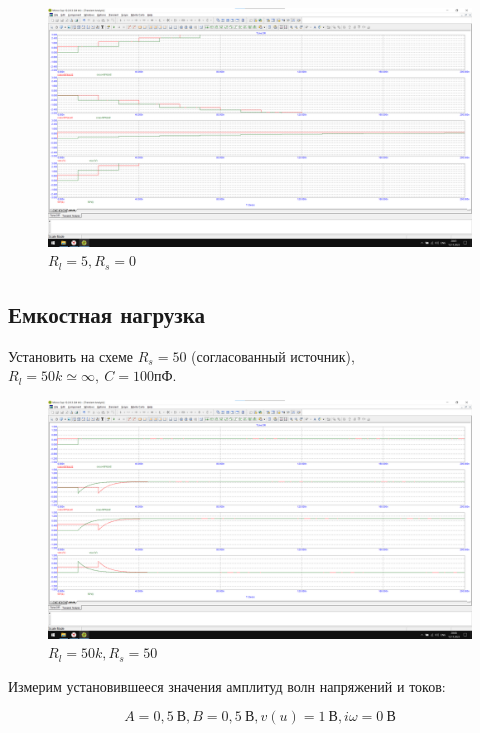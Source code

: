 \documentclass[a4paper, 12pt]{article}
\begin{document}
    \begin{figure}[H]
    \centering
    \includegraphics[width = 14 cm]{images/Graph14.png}
    \caption{$R_l = 5, R_s = 0$}
    \end{figure}

    \subsection*{Емкостная нагрузка}

    Установить на схеме $R_s = 50$ (согласованный источник), $R_l = 50k \simeq \infty, \: C = 100 \textit{пФ}$.

    \begin{figure}[H]
    \centering
    \includegraphics[width = 14 cm]{images/Graph15.png}
    \caption{$R_l = 50k, R_s = 50$}
    \end{figure}

    Измерим установившееся значения амплитуд волн напряжений и токов:

    \[A = 0,5 \: \text{В}, B = 0,5 \: \text{В}, v(u) = 1 \: \text{В}, i\omega = 0 \: \text{В}\]
\end{document}
